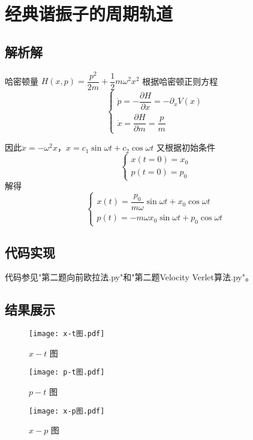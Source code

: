 \documentclass[12pt, openany]{article}
\begin{document}
	\section{经典谐振子的周期轨道}
	\subsection{解析解}
	哈密顿量
		$H(x,p)=\dfrac{p^2}{2m} + \dfrac{1}{2}m\omega^2x^2$
	根据哈密顿正则方程
	\begin{equation}
		\left\{\begin{matrix}
			\dot{p}=-\dfrac{\partial H}{\partial x}=-\partial_x V(x)\\
			\dot{x}=\dfrac{\partial H}{\partial m} = \dfrac{p}{m}
		\end{matrix}\right.
	\end{equation}

因此$\ddot{x}=-\omega^2 x$，$x = c_1\sin\omega t + c_2\cos\omega t$
又根据初始条件
\begin{equation}
	\left\{\begin{matrix}
		x(t=0) = x_0 \\
		p(t=0) = p_0
	\end{matrix}\right.
\end{equation}
解得
\begin{equation}
	\left\{\begin{matrix}
		x(t) = \dfrac{p_0}{m\omega}\sin\omega t + x_0\cos\omega t \\
		p(t) = -m\omega x_0\sin\omega t + p_0\cos\omega t
	\end{matrix}\right.
\end{equation}
	\subsection{代码实现}
	代码参见"第二题向前欧拉法.py"和"第二题Velocity Verlet算法.py"。
	\subsection{结果展示}
	\begin{figure}[!htb]
		\centering
		\texttt{[image: x-t图.pdf]}
		\caption{$x-t$ 图}
	\end{figure}
	\begin{figure}[!htb]
		\centering
		\texttt{[image: p-t图.pdf]}
		\caption{$p-t$ 图}
	\end{figure}
	\begin{figure}[!htb]
		\centering
		\texttt{[image: x-p图.pdf]}
		\caption{$x-p$ 图}
	\end{figure}
\end{document}
